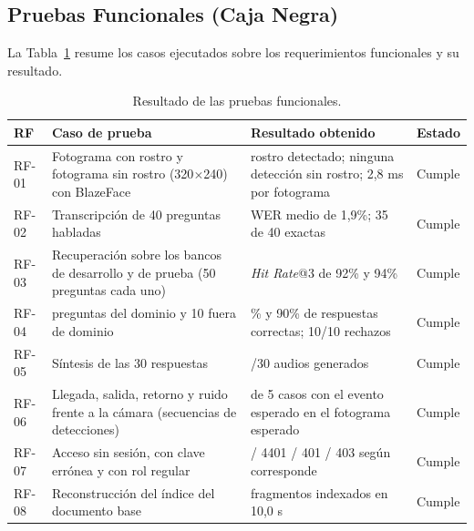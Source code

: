 \subsection{Pruebas Funcionales (Caja Negra)}
La Tabla~\ref{tab:pruebas_funcionales} resume los casos ejecutados sobre los requerimientos funcionales y su resultado.

\begin{table}[H]
  \caption{Resultado de las pruebas funcionales.}
  \label{tab:pruebas_funcionales}
  \centering
  \small
  \renewcommand{\arraystretch}{1.2}
  \begin{tabular}{|>{\raggedright\arraybackslash}p{1.3cm}|>{\raggedright\arraybackslash}p{5.1cm}|>{\raggedright\arraybackslash}p{4.0cm}|>{\centering\arraybackslash}p{1.6cm}|}
    \hline
    \rowcolor[HTML]{EFEFEF}
    \textbf{RF} & \textbf{Caso de prueba} & \textbf{Resultado obtenido} & \textbf{Estado} \\ \hline
    RF-01 & Fotograma con rostro y fotograma sin rostro (320$\times$240) con BlazeFace & 1 rostro detectado; ninguna detección sin rostro; 2,8 ms por fotograma & Cumple \\ \hline
    RF-02 & Transcripción de 40 preguntas habladas & WER medio de 1,9\%; 35 de 40 exactas & Cumple \\ \hline
    RF-03 & Recuperación sobre los bancos de desarrollo y de prueba (50 preguntas cada uno) & \textit{Hit Rate}@3 de 92\% y 94\% & Cumple \\ \hline
    RF-04 & 80 preguntas del dominio y 10 fuera de dominio & 80\% y 90\% de respuestas correctas; 10/10 rechazos & Cumple \\ \hline
    RF-05 & Síntesis de las 30 respuestas & 30/30 audios generados & Cumple \\ \hline
    RF-06 & Llegada, salida, retorno y ruido frente a la cámara (secuencias de detecciones) & 5 de 5 casos con el evento esperado en el fotograma esperado & Cumple \\ \hline
    RF-07 & Acceso sin sesión, con clave errónea y con rol regular & 401 / 4401 / 401 / 403 según corresponde & Cumple \\ \hline
    RF-08 & Reconstrucción del índice del documento base & 89 fragmentos indexados en 10,0 s & Cumple \\ \hline
  \end{tabular}
  \elaboradopor{\autorTFG}
\end{table}

